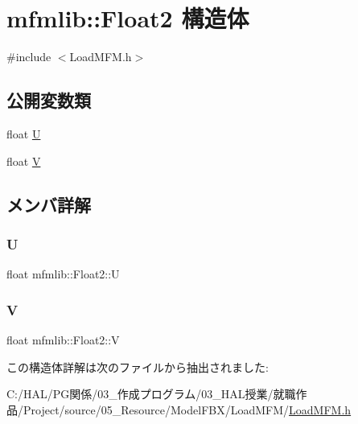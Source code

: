 \hypertarget{structmfmlib_1_1_float2}{}\section{mfmlib\+:\+:Float2 構造体}
\label{structmfmlib_1_1_float2}


{\ttfamily \#include $<$Load\+M\+F\+M.\+h$>$}

\subsection*{公開変数類}
\begin{DoxyCompactItemize}
\item 
float \mbox{\hyperlink{structmfmlib_1_1_float2_af24ca8c716caaeff78dccf93f7974ee3}{U}}
\item 
float \mbox{\hyperlink{structmfmlib_1_1_float2_a270a8750538452dfba45bf5ddf4b5c86}{V}}
\end{DoxyCompactItemize}


\subsection{メンバ詳解}
\mbox{\label{structmfmlib_1_1_float2_af24ca8c716caaeff78dccf93f7974ee3}} 
\subsubsection{\texorpdfstring{U}{U}}
{\footnotesize\ttfamily float mfmlib\+::\+Float2\+::U}

\mbox{\label{structmfmlib_1_1_float2_a270a8750538452dfba45bf5ddf4b5c86}} 
\subsubsection{\texorpdfstring{V}{V}}
{\footnotesize\ttfamily float mfmlib\+::\+Float2\+::V}



この構造体詳解は次のファイルから抽出されました\+:\begin{DoxyCompactItemize}
\item 
C\+:/\+H\+A\+L/\+P\+G関係/03\+\_\+作成プログラム/03\+\_\+\+H\+A\+L授業/就職作品/\+Project/source/05\+\_\+\+Resource/\+Model\+F\+B\+X/\+Load\+M\+F\+M/\mbox{\hyperlink{_load_m_f_m_8h}{Load\+M\+F\+M.\+h}}\end{DoxyCompactItemize}
